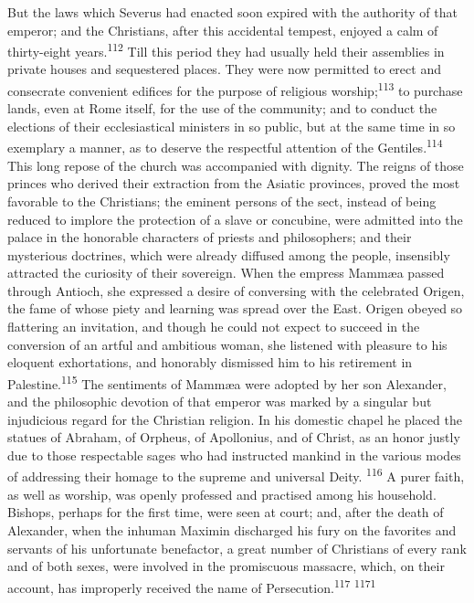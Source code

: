 But the laws which Severus had enacted soon expired with the
authority of that emperor; and the Christians, after this
accidental tempest, enjoyed a calm of thirty-eight years.\textsuperscript{112}
Till this period they had usually held their assemblies in
private houses and sequestered places. They were now permitted to
erect and consecrate convenient edifices for the purpose of
religious worship;\textsuperscript{113} to purchase lands, even at Rome itself,
for the use of the community; and to conduct the elections of
their ecclesiastical ministers in so public, but at the same time
in so exemplary a manner, as to deserve the respectful attention
of the Gentiles.\textsuperscript{114} This long repose of the church was
accompanied with dignity. The reigns of those princes who derived
their extraction from the Asiatic provinces, proved the most
favorable to the Christians; the eminent persons of the sect,
instead of being reduced to implore the protection of a slave or
concubine, were admitted into the palace in the honorable
characters of priests and philosophers; and their mysterious
doctrines, which were already diffused among the people,
insensibly attracted the curiosity of their sovereign. When the
empress Mammæa passed through Antioch, she expressed a desire of
conversing with the celebrated Origen, the fame of whose piety
and learning was spread over the East. Origen obeyed so
flattering an invitation, and though he could not expect to
succeed in the conversion of an artful and ambitious woman, she
listened with pleasure to his eloquent exhortations, and
honorably dismissed him to his retirement in Palestine.\textsuperscript{115} The
sentiments of Mammæa were adopted by her son Alexander, and the
philosophic devotion of that emperor was marked by a singular but
injudicious regard for the Christian religion. In his domestic
chapel he placed the statues of Abraham, of Orpheus, of
Apollonius, and of Christ, as an honor justly due to those
respectable sages who had instructed mankind in the various modes
of addressing their homage to the supreme and universal Deity. \textsuperscript{116}
A purer faith, as well as worship, was openly professed and
practised among his household. Bishops, perhaps for the first
time, were seen at court; and, after the death of Alexander, when
the inhuman Maximin discharged his fury on the favorites and
servants of his unfortunate benefactor, a great number of
Christians of every rank and of both sexes, were involved in the
promiscuous massacre, which, on their account, has improperly
received the name of Persecution.\textsuperscript{117} \textsuperscript{1171}

